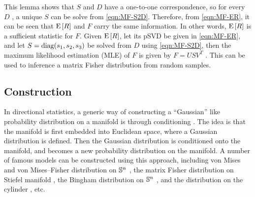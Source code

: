 This lemma shows that $S$ and $D$ have a one-to-one correspondence, so for every $D$ , a unique $S$ can be solve from \eqref{eqn:MF-S2D}.
Therefore, from \eqref{eqn:MF-ER}, it can be seen that $\mathrm{E}\left[ R \right]$ and $F$ carry the same information.
In other words, $\mathrm{E}\left[ R \right]$ is a sufficient statistic for $F$.
Given $\mathrm{E}\left[ R \right]$, let its pSVD be given in \eqref{eqn:MF-ER}, and let $S = \mathrm{diag}(s_1,s_2,s_3)$ be solved from $D$ using \eqref{eqn:MF-S2D},
then the maximum likelihood estimation (MLE) of $F$ is given by $F=USV^T$ \cite{khatri1977mises,lee2018bayesian}.
This can be used to inference a matrix Fisher distribution from random samples.

\subsection{Construction}

In directional statistics, a generic way of constructing a ``Gaussian'' like probability distribution on a manifold is through conditioning \cite{pewsey2021recent}.
The idea is that the manifold is first embedded into Euclidean space, where a Gaussian distribution is defined.
Then the Gaussian distribution is conditioned onto the manifold, and becomes a new probability distribution on the manifold.
A number of famous models can be constructed using this approach, including von Mises and von Mises--Fisher distribution on $\mathbb{S}^n$ \cite{mardia2009directional}, the matrix Fisher distribution on Stiefel manifold \cite{downs1972orientation}, the Bingham distribution on $\mathbb{S}^n$ \cite{bingham1974antipodally}, and the distribution on the cylinder \cite{mardia1978model}, etc.

